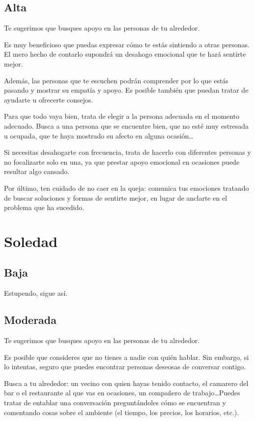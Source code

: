         \subsection{Alta}
            Te sugerimos que busques apoyo en las personas de tu alrededor.

            Es muy beneficioso que puedas expresar cómo te estás sintiendo a otras personas. El mero hecho de contarlo supondrá un desahogo emocional que te hará sentirte mejor.
            
            Además, las personas que te escuchen podrán comprender por lo que estás pasando y mostrar su empatía y apoyo. Es posible también que puedan tratar de ayudarte u ofrecerte consejos.
            
            Para que todo vaya bien, trata de elegir a la persona adecuada en el momento adecuado. Busca a una persona que se encuentre bien, que no esté muy estresada u ocupada, que te haya mostrado su afecto en alguna ocasión…
            
            Si necesitas desahogarte con frecuencia, trata de hacerlo con diferentes personas y no focalizarte solo en una, ya que prestar apoyo emocional en ocasiones puede resultar algo cansado.
           
            Por último, ten cuidado de no caer en la queja: comunica tus emociones tratando de buscar soluciones y formas de sentirte mejor, en lugar de anclarte en el problema que ha sucedido.

    \section{Soledad}
        \label{chapter:recomendaciones:soledad}
        \subsection{Baja}
            Estupendo, sigue así. 
        \subsection{Moderada}
            Te sugerimos que busques apoyo en las personas de tu alrededor.

            Es posible que consideres que no tienes a nadie con quién hablar. Sin embargo, si lo intentas, seguro que puedes encontrar personas deseosas de conversar contigo.
            
            Busca a tu alrededor: un vecino con quien hayas tenido contacto, el camarero del bar o el restaurante al que vas en ocasiones, un compañero de trabajo…Puedes tratar de entablar una conversación preguntándoles cómo se encuentran y comentando cosas sobre el ambiente (el tiempo, los precios, los horarios, etc.).
            
